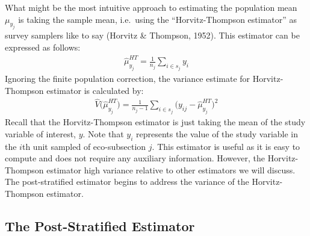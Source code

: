 \documentclass[12pt,twoside]{reedthesis}
\begin{document}
What might be the most intuitive approach to estimating the population mean \(\mu_{y_j}\) is taking the sample mean, i.e.~using the ``Horvitz-Thompson estimator'' as survey samplers like to say (Horvitz \& Thompson, 1952). This estimator can be expressed as follows:
\begin{align}
\hat\mu_{y_j}^{HT} = \frac{1}{n_j} \sum_{i \in s_j} y_i
\end{align}
Ignoring the finite population correction, the variance estimate for Horvitz-Thompson estimator is calculated by:
\begin{align}
\hat V\Big(\hat\mu_{y_j}^{HT}\Big) = \frac{1}{n_j-1} \sum_{i \in s_j} \Big(y_{ij} - \hat\mu_{y_j}^{HT}\Big)^2
\end{align}
Recall that the Horvitz-Thompson estimator is just taking the mean of the study variable of interest, \(y\). Note that \(y_i\) represents the value of the study variable in the \(i\)th unit sampled of eco-subsection \(j\). This estimator is useful as it is easy to compute and does not require any auxiliary information. However, the Horvitz-Thompson estimator high variance relative to other estimators we will discuss. The post-stratified estimator begins to address the variance of the Horvitz-Thompson estimator.

\hypertarget{the-post-stratified-estimator}{%
\subsection{The Post-Stratified Estimator}\label{the-post-stratified-estimator}}
\end{document}
